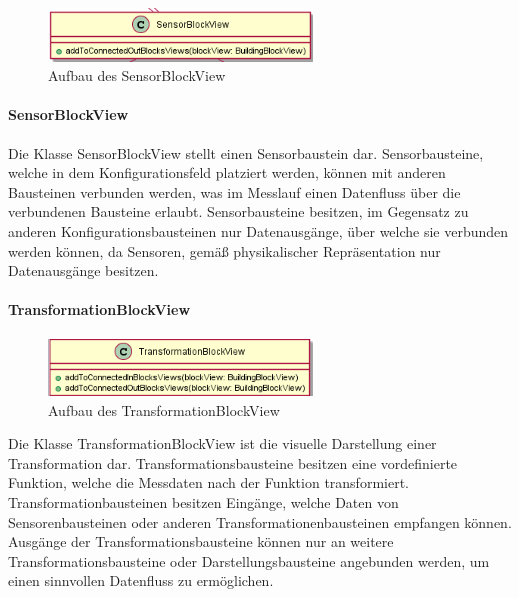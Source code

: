 \documentclass[parskip=full]{scrartcl}
\begin{document}
\begin{figure}[htbp]
	\begin{center}
		\includegraphics[width = 7cm]{Grafiken/View/SensorBlockView.png}
		\caption{Aufbau des SensorBlockView}
		\label{Entwurf_Grob}
	\end{center}
\end{figure}

\paragraph{SensorBlockView}

Die Klasse SensorBlockView stellt einen Sensorbaustein dar. 
Sensorbausteine, welche in dem Konfigurationsfeld platziert werden, können mit anderen Bausteinen verbunden werden, was im Messlauf einen Datenfluss über die verbundenen Bausteine erlaubt. Sensorbausteine besitzen, im Gegensatz zu anderen Konfigurationsbausteinen nur Datenausgänge, über welche sie verbunden werden können, da Sensoren, gemäß physikalischer 
Repräsentation nur Datenausgänge besitzen.

\paragraph{TransformationBlockView}

\begin{figure}[htbp]
	\begin{center}
		\includegraphics[width = 7cm]{Grafiken/View/TransformationBlockView.png}
		\caption{Aufbau des TransformationBlockView}
		\label{Entwurf_Grob}
	\end{center}
\end{figure}

Die Klasse TransformationBlockView ist die visuelle Darstellung einer Transformation dar. Transformationsbausteine besitzen eine vordefinierte Funktion, welche die Messdaten nach der Funktion transformiert. Transformationbausteinen besitzen Eingänge, welche Daten von Sensorenbausteinen oder anderen Transformationenbausteinen empfangen können. Ausgänge der Transformationsbausteine können nur an weitere Transformationsbausteine oder Darstellungsbausteine angebunden werden, um einen sinnvollen Datenfluss zu ermöglichen. 
\end{document}
